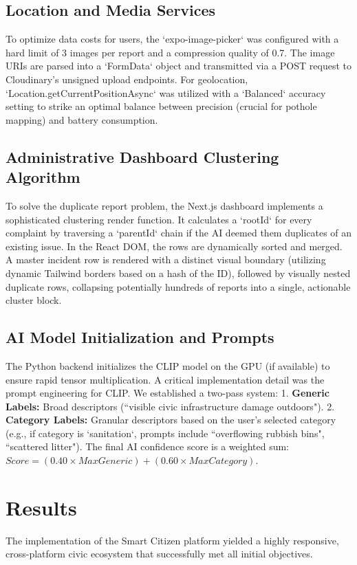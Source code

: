 \documentclass[12pt,a4paper]{report}
\begin{document}
\section{Location and Media Services}
To optimize data costs for users, the `expo-image-picker` was configured with a hard limit of 3 images per report and a compression quality of 0.7. The image URIs are parsed into a `FormData` object and transmitted via a POST request to Cloudinary's unsigned upload endpoints. For geolocation, `Location.getCurrentPositionAsync` was utilized with a `Balanced` accuracy setting to strike an optimal balance between precision (crucial for pothole mapping) and battery consumption.

\section{Administrative Dashboard Clustering Algorithm}
To solve the duplicate report problem, the Next.js dashboard implements a sophisticated clustering render function. It calculates a `rootId` for every complaint by traversing a `parentId` chain if the AI deemed them duplicates of an existing issue. In the React DOM, the rows are dynamically sorted and merged. A master incident row is rendered with a distinct visual boundary (utilizing dynamic Tailwind borders based on a hash of the ID), followed by visually nested duplicate rows, collapsing potentially hundreds of reports into a single, actionable cluster block.

\section{AI Model Initialization and Prompts}
The Python backend initializes the CLIP model on the GPU (if available) to ensure rapid tensor multiplication. A critical implementation detail was the prompt engineering for CLIP. We established a two-pass system:
1. \textbf{Generic Labels:} Broad descriptors (``visible civic infrastructure damage outdoors").
2. \textbf{Category Labels:} Granular descriptors based on the user's selected category (e.g., if category is `sanitation`, prompts include ``overflowing rubbish bins", ``scattered litter").
The final AI confidence score is a weighted sum: $Score = (0.40 \times MaxGeneric) + (0.60 \times MaxCategory)$.

\chapter{Results}
The implementation of the Smart Citizen platform yielded a highly responsive, cross-platform civic ecosystem that successfully met all initial objectives.
\end{document}
